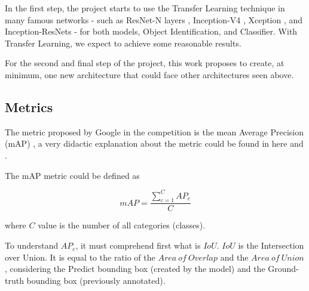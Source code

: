 \documentclass[11pt, a4paper, onecolumn]{article}
\begin{document}
In the first step, the project starts to use the Transfer Learning technique in many famous networks - such as ResNet-N layers \cite{resnet}, Inception-V4 \cite{inception}, Xception \cite{xception}, and Inception-ResNets \cite{inception} - for both models, Object Identification, and Classifier. With Transfer Learning, we expect to achieve some reasonable results.

For the second and final step of the project, this work proposes to create, at minimum, one new architecture that could face other architectures seen above.

\subsection{Metrics}

The metric proposed by Google in the competition is the mean Average Precision (mAP) \cite{map}, a very didactic explanation about the metric could be found in here \cite{medium:1} and \cite{medium:2}.

The mAP metric could be defined as

{\centering
	\begin{equation*}
	mAP = \frac{\sum\limits_{c=1}^{C}AP_c} {C}
	\end{equation*}}

where $C$ value is the number of all categories (classes).

To understand $AP_c$, it must comprehend first what is $IoU$. $IoU$ is the Intersection over Union. It is equal to the ratio of the $Area\ of\ Overlap$ and the $Area\ of\ Union$, considering the Predict bounding box (created by the model) and the Ground-truth bounding box (previously annotated).


\begin{figure}[!ht]
	\centering
	\qquad
	\label{fig:example}%
\end{figure}
\end{document}
